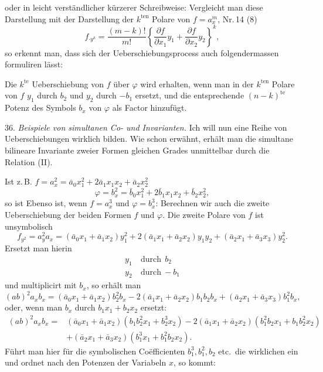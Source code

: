 oder in leicht verständlicher kürzerer Schreibweise:
Vergleicht man diese Darstellung mit der Darstellung der $k^{\text{ten}}$ Polare von $f=a_x^m$, Nr.\,14 (8)
\[
f_{\cdot y^k} = \frac{(m-k)!}{m!}\left\{\frac{\partial f}{\partial x_1}y_1+\frac{\partial f}{\partial x_2}y_2\right\}^k,
\]
so erkennt man, dass sich der Ueberschiebungsprocess auch folgendermassen formuliren lässt:

\glqq Die $k^{\text{te}}$ Ueberschiebung von $f$ über $\varphi$ wird erhalten, wenn
man in der $k^{\text{ten}}$ Polare von $f$ $y_1$ durch $b_2$ und $y_2$ durch $-b_1$
ersetzt, und die entsprechende $(n-k)^{\text{te}}$ Potenz des Symbols
$b_x$ von $\varphi$ als Factor hinzufügt.\grqq{}

36. \textit{Beispiele von simultanen Co- und Invarianten.} Ich will nun
eine Reihe von Ueberschiebungen wirklich bilden. Wie schon erwähnt,
erhält man die simultane bilineare Invariante zweier Formen gleichen
Grades unmittelbar durch die Relation (II).

Ist z.\,B. $f=a_x^2=\bar a_0x_1^2+2\bar a_1x_1x_2+\bar a_2x_2^2$
\[
\varphi=b_x^2=\bar b_0x_1^2+2\bar b_1x_1x_2+\bar b_2x_2^2,
\]
so ist
Ebenso ist, wenn $f=a_x^3$ und $\varphi=b_x^3$:
Berechnen wir auch die zweite Ueberschiebung der beiden Formen $f$ und
$\varphi$. Die zweite Polare von $f$ ist unsymbolisch
\[
f_{y^2}=a_y^2a_x=(\bar a_0x_1+\bar a_1x_2)y_1^2+2(\bar a_1x_1+\bar a_2x_2)y_1y_2+(\bar a_2x_1+\bar a_3x_3)y_2^2. %
\]
Ersetzt man hierin
\[
\begin{aligned}
y_1 &\ \text{durch}\ \ b_2\\
y_2 &\ \text{durch}\ -b_1
\end{aligned}
\]
und multiplicirt mit $b_x$, so erhält man
\[
(ab)^2a_xb_x=(\bar a_0x_1+\bar a_1x_2)b_2^2b_x-2(\bar a_1x_1+\bar a_2x_2)b_1b_2b_x+(\bar a_2x_1+\bar a_3x_3)b_1^2b_x, %
\]
oder, wenn man $b_x$ durch $b_1x_1+b_2x_2$ ersetzt:
\[
\begin{aligned}
(ab)^2a_xb_x={}&(\bar a_0x_1+\bar a_1x_2)(b_1b_2^2x_1+b_2^3x_2)-2(\bar a_1x_1+\bar a_2x_2)(b_1^2b_2x_1+b_1b_2^2x_2)\\
&+(\bar a_2x_1+\bar a_3x_2)(b_1^3x_1+b_1^2b_2x_2).
\end{aligned}
\]
Führt man hier für die symbolischen Co\"efficienten $b_1^3, b_1^2, b_2$ etc.\ die
wirklichen ein und ordnet nach den Potenzen der Variabeln $x$, so kommt:

